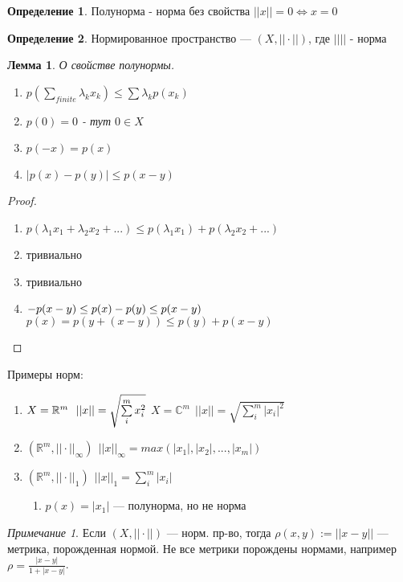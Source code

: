\documentclass[12pt]{article}
\theoremstyle{plain}
\newtheorem{lemma}{Лемма}
\theoremstyle{remark}
\newtheorem*{remark}{Примечание}
\theoremstyle{definition}
\newtheorem*{definition}{Определение}
\begin{document}
\begin{definition}
Полунорма - норма без свойства $||x||=0\Leftrightarrow x=0$
\end{definition}

\begin{definition}
Нормированное пространство --- $(X, ||\cdot||)$, где $||||$ - норма
\end{definition}

\begin{lemma}
О свойстве полунормы.
\begin{enumerate}
\item $p(\sum\limits_{finite}\lambda_kx_k)\leq\sum\lambda_kp(x_k)$
\item $p(0)=0$ - тут $0\in X$
\item $p(-x)=p(x)$
\item $|p(x)-p(y)|\leq p(x-y)$
\end{enumerate}
\end{lemma}

\begin{proof}
\begin{enumerate}
\item $p(\lambda_1x_1+\lambda_2x_2+...)\leq p(\lambda_1x_1)+p(\lambda_2x_2+...)$
\item тривиально
\item тривиально
\item $-p(x-y)\leq p(x)-p(y)\leq p(x-y)\\$
$p(x)=p(y+(x-y))\leq p(y)+p(x-y)$
\end{enumerate}
\end{proof}

Примеры норм:
\begin{enumerate}
\item $X=\mathbb R^m \ \ ||x||=\sqrt{\sum\limits_{i}^m x_i^2} \\$
$X=\mathbb{C}^m \ \ ||x||=\sqrt{\sum\limits_{i}^m |x_i|^2}$
\item $(\mathbb R^m, ||\cdot||_\infty) \ \ ||x||_\infty=max(|x_1|,|x_2|,...,|x_m|)$
\item $(\mathbb R^m, ||\cdot||_1) \ \ ||x||_1=\sum\limits_i^m |x_i|$
\begin{enumerate}
\item $p(x)=|x_1|$ --- полунорма, но не норма
\end{enumerate}
\end{enumerate}

\begin{remark}
Если $(X, ||\cdot||)$ --- норм. пр-во, тогда $\rho(x,y):=||x-y||$ --- метрика,
порожденная нормой. Не все метрики порождены нормами, например $\rho=\frac{|x-y|}{1+|x-y|}$.
\end{remark}
\end{document}
